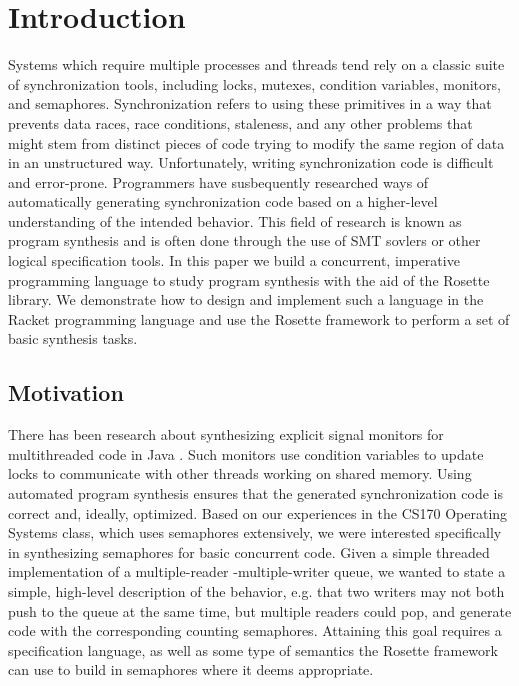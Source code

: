 \section{Introduction}
Systems which require multiple processes and threads tend rely on a classic suite of synchronization tools, including locks, mutexes, condition variables, monitors, and semaphores.  Synchronization refers to using these primitives in a way that prevents data races, race conditions, staleness, and any other problems that might stem from distinct pieces of code trying to modify the same region of data in an unstructured way.  Unfortunately, writing synchronization code is difficult and error-prone.  Programmers have susbequently researched ways of automatically generating synchronization code based on a higher-level understanding of the intended behavior.  This field of research is known as program synthesis and is often done through the use of SMT sovlers or other logical specification tools.  In this paper we build a concurrent, imperative programming language to study program synthesis with the aid of the Rosette library.  We demonstrate how to design and implement such a language in the Racket programming language and use the Rosette framework to perform a set of basic synthesis tasks.

\subsection{Motivation}
There has been research about synthesizing explicit signal monitors for multithreaded code in Java \citep{ferles2018}. Such monitors use condition variables to update locks to communicate with other threads working on shared memory. Using automated program synthesis ensures that the generated synchronization code is correct and, ideally, optimized.  Based on our experiences in the CS170 Operating Systems class, which uses semaphores extensively, we were interested specifically in synthesizing semaphores for basic concurrent code.  Given a simple threaded implementation of a multiple-reader -multiple-writer queue, we wanted to state a simple, high-level description of the behavior, e.g. that two writers may not both push to the queue at the same time, but multiple readers could pop, and generate code with the corresponding counting semaphores.  Attaining this goal requires a specification language, as well as some type of semantics the Rosette framework can use to build in semaphores where it deems appropriate.  

